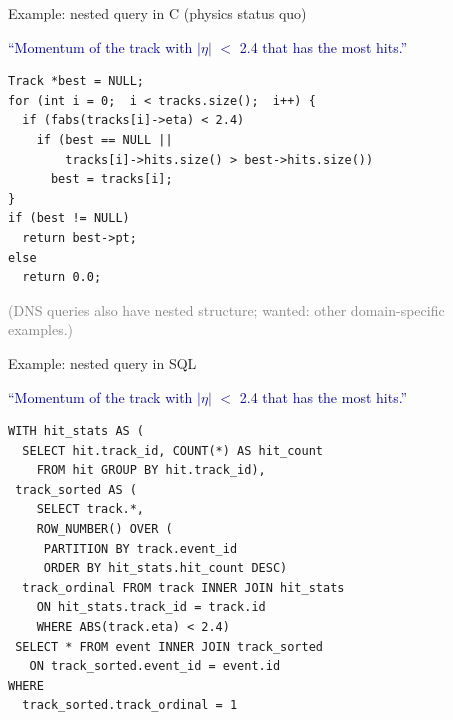 \documentclass{beamer}
\begin{document}
\begin{frame}[fragile]{Example: nested query in C (physics status quo)}
\vspace{0.25 cm}
\begin{center}
\begin{minipage}{0.95\linewidth}
\textcolor{darkblue}{``Momentum of the track with $|\eta|$ $<$ 2.4 that has the most hits.''}

\vspace{-0.5 cm}
\textcolor{darkblue}{}

\end{minipage}
\end{center}
\small
\begin{verbatim}
Track *best = NULL;
for (int i = 0;  i < tracks.size();  i++) {
  if (fabs(tracks[i]->eta) < 2.4)
    if (best == NULL ||
        tracks[i]->hits.size() > best->hits.size())
      best = tracks[i];
}
if (best != NULL)
  return best->pt;
else
  return 0.0;
\end{verbatim}

\vspace{-0.1 cm}
\textcolor{gray}{(DNS queries also have nested structure; wanted: other domain-specific examples.)}
\end{frame}

\begin{frame}[fragile]{Example: nested query in SQL}
\vspace{0.25 cm}
\begin{center}
\begin{minipage}{0.95\linewidth}
\textcolor{darkblue}{``Momentum of the track with $|\eta|$ $<$ 2.4 that has the most hits.''}
\end{minipage}
\end{center}
\small
\begin{verbatim}
WITH hit_stats AS (
  SELECT hit.track_id, COUNT(*) AS hit_count
    FROM hit GROUP BY hit.track_id),
 track_sorted AS (
    SELECT track.*, 
    ROW_NUMBER() OVER (
     PARTITION BY track.event_id
     ORDER BY hit_stats.hit_count DESC)
  track_ordinal FROM track INNER JOIN hit_stats
    ON hit_stats.track_id = track.id
    WHERE ABS(track.eta) < 2.4)
 SELECT * FROM event INNER JOIN track_sorted
   ON track_sorted.event_id = event.id
WHERE
  track_sorted.track_ordinal = 1
\end{verbatim}
\end{frame}
\end{document}
